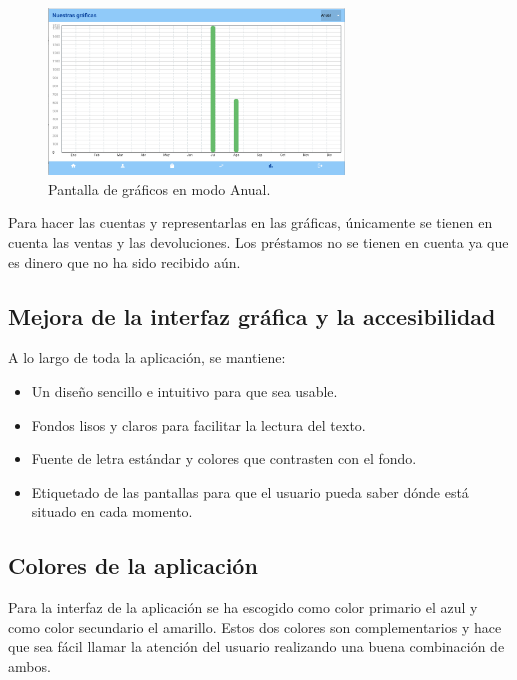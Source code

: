 \begin{figure}[H]
	\centering
	\includegraphics[width=0.7\textwidth]{imagenes/TerceraIteracion/graficosAnual.png}
	\caption{Pantalla de gráficos en modo Anual.}
	\label{fig:anual}
\end{figure}

Para hacer las cuentas y representarlas en las gráficas, únicamente se tienen en cuenta las ventas y las devoluciones. Los préstamos no se tienen en cuenta ya que es dinero que no ha sido recibido aún. 



\subsection{Mejora de la interfaz gráfica y la accesibilidad}

A lo largo de toda la aplicación, se mantiene: 

\begin{itemize}
	\item Un diseño sencillo e intuitivo para que sea usable.
	\item Fondos lisos y claros para facilitar la lectura del texto. 
	\item Fuente de letra estándar y colores que contrasten con el fondo.  
	\item Etiquetado de las pantallas para que el usuario pueda saber dónde está situado en cada momento. 
\end{itemize}

\subsection{Colores de la aplicación}

Para la interfaz de la aplicación se ha escogido como color primario el azul y como color secundario el amarillo. Estos dos colores son complementarios y hace que sea fácil llamar la atención del usuario realizando una buena combinación de ambos. 

